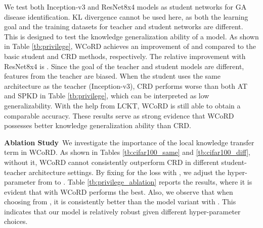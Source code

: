 \documentclass[final]{cvpr}
\theoremstyle{definition}
\begin{document}
We test both Inception-v3 and ResNet8x4 models as student networks for GA disease identification. 
KL divergence cannot be used here, as both the learning goal and the training datasets for teacher and student networks are different.
This is designed to test the knowledge generalization ability of a model. 
As shown in Table \ref{tb:privilege}, WCoRD achieves an improvement of  and  compared to the basic student and CRD methods, respectively.
The relative improvement with ResNet8x4 is .
Since the goal of the teacher and student models are different, features from the teacher are biased.
When the student uses the same architecture as the teacher (Inception-v3), CRD performs worse than both AT and SPKD in Table \ref{tb:privilege}, which can be interpreted as low generalizability. With the help from LCKT, WCoRD is still able to obtain a comparable accuracy.
These results serve as strong evidence that WCoRD possesses better knowledge generalization ability than CRD. 

\begin{table}[t!]
\begin{center}
\caption{
\small {AUC (\%) of student network ResNet-8x4 with different weights on the local knowledge transfer term.}
    }
\label{tb:privilege_ablation}
\end{center}
\vspace{-6mm}
\end{table} 

\vspace{5pt}
\noindent\textbf{Ablation Study}\,
We investigate the importance of the local knowledge transfer term   in WCoRD. As shown in Tables \ref{tb:cifar100_same} and \ref{tb:cifar100_diff}, without it, WCoRD cannot consistently outperform CRD in different student-teacher architecture settings. 
By fixing  for the  loss with , we adjust the hyper-parameter  from  to . Table \ref{tb:privilege_ablation} reports the results, where it is evident that with  WCoRD performs the best. 
Also, we observe that when choosing  from , it is consistently better than the model variant with . This indicates that our model is relatively robust given different hyper-parameter choices.
\end{document}
